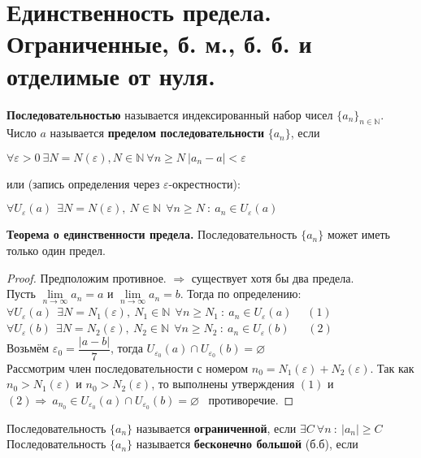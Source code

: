 \documentclass[12pt]{article}
\begin{document}
\section{Единственность предела. Ограниченные, б. м., б. б.  и отделимые от нуля.}
    \textbf{Последовательностью} называется индексированный набор чисел $\{a_n\}_{n \in \mathbb{N}}$. \\
    Число $a$ называется \textbf{пределом последовательности} $\{a_n\}$, если 
    \begin{center}
         $\forall \varepsilon  > 0 \ \exists N = N(\varepsilon), N \in \mathbb{N} \ \forall n \geq N \ |a_n - a| < \varepsilon$
    \end{center}
    или (запись определения через $\varepsilon$-окрестности): 
    \begin{center}
         $\forall U_\varepsilon(a) \ \ \exists N = N(\varepsilon), \ N \in \mathbb{N} \ \ \forall n \geq N \ : \  a_n \in  U_\varepsilon(a)$
    \end{center}
    \textbf{Теорема о единственности предела.} Последовательность $\{a_n\}$ может иметь только один предел.
    \begin{proof}
        Предположим противное. $\Rightarrow$ существует хотя бы два предела. \\ Пусть $\lim\limits_{n \to \infty} a_n = a$ и $\lim\limits_{n \to \infty} a_n = b$. Тогда по определению: \\
        $\forall U_\varepsilon(a) \ \ \exists N = N_1(\varepsilon), \ N_1 \in \mathbb{N} \ \ \forall n \geq N_1 \ : \  a_n \in  U_\varepsilon(a) \ \ $ \  $(1)$
        \\
        $\forall U_\varepsilon(b) \ \ \exists N = N_2(\varepsilon), \ N_2 \in \mathbb{N} \ \ \forall n \geq N_2 \ : \  a_n \in  U_\varepsilon(b)   \ $ \ \ $(2)$ \\
        Возьмём $\varepsilon_0 = \dfrac{|a-b|}{7}$, тогда $U_{\varepsilon_0}(a) \cap U_{\varepsilon_0}(b) = \varnothing$ \\
        Рассмотрим член последовательности с номером $n_0 = N_1(\varepsilon) + N_2(\varepsilon)$. Так как $n_0 > N_1(\varepsilon)$ и $n_0 > N_2(\varepsilon)$, то выполнены утверждения $(1)$ и $(2) \Rightarrow \ a_{n_0}  \in U_{\varepsilon_0}(a) \cap U_{\varepsilon_0}(b) = \varnothing$ \ противоречие.
    \end{proof}
    \noindent Последовательность $\{a_n\}$ называется \textbf{ограниченной}, если $ \exists C \ \forall n \ : \ |a_n| \geq C$ \\
    Последовательность $\{a_n\}$ называется \textbf{бесконечно большой} (б.б), если 
\end{document}
